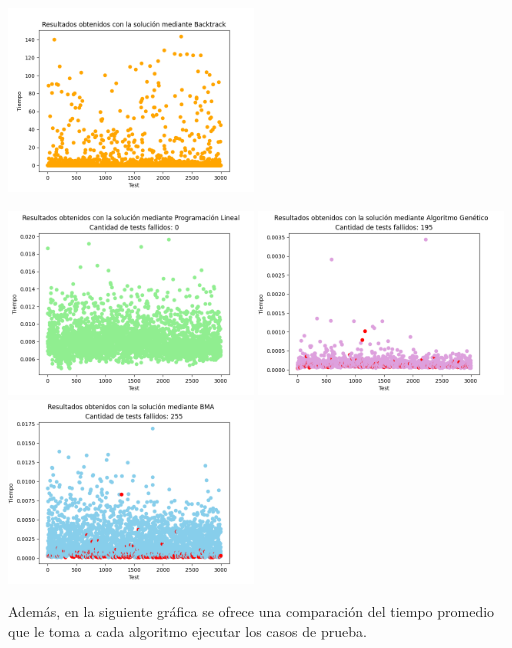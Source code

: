 \documentclass[10pt]{article} %
\begin{document}
    \begin{center}
    	\includegraphics[width=6.5cm]{Backtrack_results.png}
    \end{center}  
	
	\begin{center}
		\includegraphics[width=6.5cm]{LP_results}
		\includegraphics[width=6.5cm]{GA_results}
		\includegraphics[width=6.5cm]{BMA_results}
	\end{center}
 
    Adem\'as, en la siguiente gr\'afica se ofrece una comparaci\'on del tiempo promedio que le toma a cada algoritmo ejecutar los casos de prueba. 
    
\end{document}
